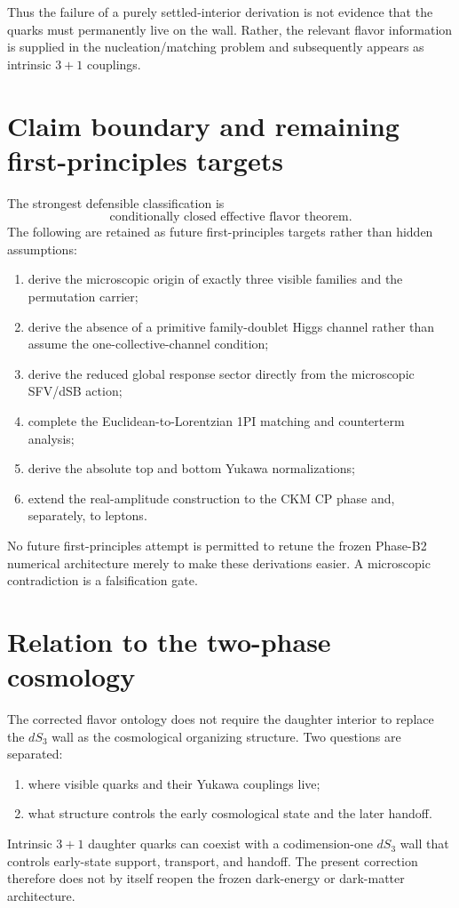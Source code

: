 \documentclass[11pt]{article}
\begin{document}
Thus the failure of a purely settled-interior derivation is not evidence that the quarks must permanently live on the wall. Rather, the relevant flavor information is supplied in the nucleation/matching problem and subsequently appears as intrinsic $3+1$ couplings.

\section{Claim boundary and remaining first-principles targets}
The strongest defensible classification is
\begin{equation}
\boxed{\text{conditionally closed effective flavor theorem}.}
\end{equation}
The following are retained as future first-principles targets rather than hidden assumptions:
\begin{enumerate}
\item derive the microscopic origin of exactly three visible families and the permutation carrier;
\item derive the absence of a primitive family-doublet Higgs channel rather than assume the one-collective-channel condition;
\item derive the reduced global response sector directly from the microscopic SFV/dSB action;
\item complete the Euclidean-to-Lorentzian 1PI matching and counterterm analysis;
\item derive the absolute top and bottom Yukawa normalizations;
\item extend the real-amplitude construction to the CKM CP phase and, separately, to leptons.
\end{enumerate}
No future first-principles attempt is permitted to retune the frozen Phase-B2 numerical architecture merely to make these derivations easier. A microscopic contradiction is a falsification gate.

\section{Relation to the two-phase cosmology}
The corrected flavor ontology does not require the daughter interior to replace the $dS_3$ wall as the cosmological organizing structure. Two questions are separated:
\begin{enumerate}
\item where visible quarks and their Yukawa couplings live;
\item what structure controls the early cosmological state and the later handoff.
\end{enumerate}
Intrinsic $3+1$ daughter quarks can coexist with a codimension-one $dS_3$ wall that controls early-state support, transport, and handoff. The present correction therefore does not by itself reopen the frozen dark-energy or dark-matter architecture.
\end{document}
